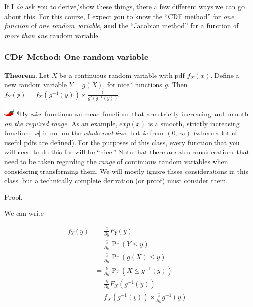 \documentclass[
  letterpaper,
  DIV=11,
  numbers=noendperiod]{scrreprt}
\begin{document}
If I \emph{do} ask you to derive/show these things, there a few
different ways we can go about this. For this course, I expect you to
know the ``CDF method'' for \emph{one function} of \emph{one random
variable}, \textbf{and} the ``Jacobian method'' for a function of
\emph{more than one} random variable.

\subsubsection{CDF Method: One random
variable}\label{cdf-method-one-random-variable}

\textbf{Theorem}. Let \(X\) be a continuous random variable with pdf
\(f_X(x)\). Define a new random variable \(Y = g(X)\), for nice*
functions \(g\). Then
\(f_Y(y) = f_X(g^{-1}(y)) \times \frac{1}{g'(g^{-1}(y))}\).

\includegraphics[width=0.20833in,height=0.16667in]{images/chilipepper.png}
*By \emph{nice} functions we mean functions that are strictly increasing
and smooth \emph{on the required range}. As an example, \(exp(x)\) is a
smooth, strictly increasing function; \(|x|\) is not on the \emph{whole
real line}, but \emph{is} from \((0, \infty)\) (where a lot of useful
pdfs are defined). For the purposes of this class, every function that
you will need to do this for will be ``nice.'' Note that there are also
considerations that need to be taken regarding the \emph{range} of
continuous random variables when considering transforming them. We will
mostly ignore these considerations in this class, but a technically
complete derivation (or proof) must consider them.

Proof.

We can write

\begin{align*}
    f_Y(y) & = \frac{\partial}{\partial y} F_Y(y) \\
    & = \frac{\partial}{\partial y} \Pr(Y \leq y) \\
    & = \frac{\partial}{\partial y} \Pr(g(X) \leq y) \\
    & = \frac{\partial}{\partial y} \Pr(X \leq g^{-1}(y)) \\
    & = \frac{\partial}{\partial y} F_X(g^{-1}(y)) \\
    & = f_X(g^{-1}(y)) \times \frac{\partial}{\partial y} g^{-1}(y) 
\end{align*}
\end{document}

